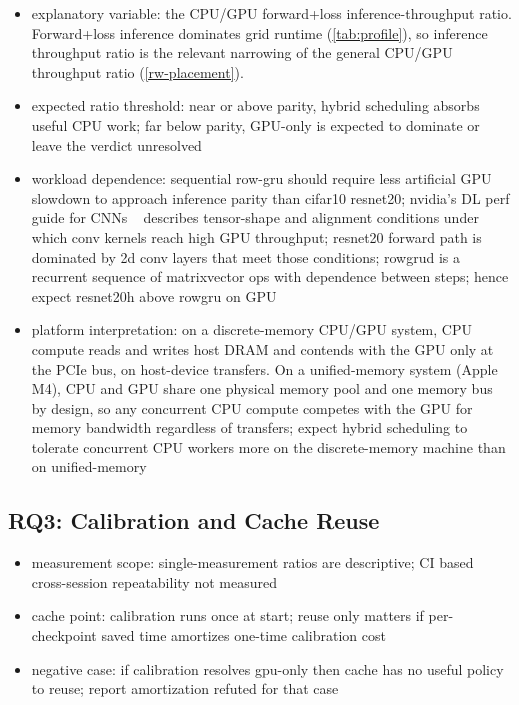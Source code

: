 \documentclass[conference]{IEEEtran}
\newcommand{\tightlist}{\setlength{\itemsep}{0pt}\setlength{\parskip}{0pt}}
\begin{document}
\begin{itemize}\tightlist
  \item explanatory variable: the CPU/GPU forward+loss
    inference-throughput ratio. Forward+loss inference
    dominates grid runtime (\ref{tab:profile}), so
    inference throughput ratio is the relevant narrowing of
    the general CPU/GPU throughput ratio
    (\ref{rw-placement}).
  \item expected ratio threshold: near or above parity, hybrid
    scheduling absorbs useful CPU work; far below parity,
    GPU-only is expected to dominate or
    leave the verdict unresolved
  \item workload dependence: sequential row-gru should
    require less artificial GPU slowdown to approach
    inference parity than cifar10 resnet20; nvidia's
    DL perf guide for CNNs ~\cite{nvidia_cudnn_convolution_guide} describes
    tensor-shape and alignment conditions under which
    conv kernels reach high GPU throughput;
    resnet20 forward path is dominated by 2d conv
    layers that meet those conditions; rowgrud
    is a recurrent sequence of matrixvector
    ops with dependence between steps; hence expect resnet20h above
    rowgru on GPU
  \item platform interpretation: on a discrete-memory
    CPU/GPU system, CPU compute reads and writes host DRAM and
    contends with the GPU only at the PCIe bus, on host-device
    transfers. On a unified-memory system (Apple M4), CPU and
    GPU share one physical memory pool and one memory bus by
    design, so any concurrent CPU compute competes with the
    GPU for memory bandwidth regardless of transfers; expect hybrid scheduling to tolerate concurrent
    CPU workers more on the discrete-memory machine than on unified-memory
\end{itemize}

\subsection{RQ3: Calibration and Cache Reuse}\label{rq3-calibration-and-cache-reuse}

\begin{itemize}\tightlist
  \item measurement scope: single-measurement ratios are descriptive;
    CI based cross-session repeatability not measured
  \item cache point: calibration runs once at start; reuse only matters
    if per-checkpoint saved time amortizes one-time calibration cost
  \item negative case: if calibration resolves gpu-only then cache has
    no useful policy to reuse; report amortization refuted for that case
\end{itemize}
\end{document}
